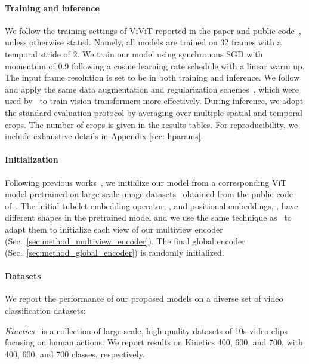 \paragraph{Training and inference} 
We follow the training settings of ViViT reported in the paper and public code~\cite{arnab2021vivit}, unless otherwise stated. 
Namely, all models are trained on 32 frames with a temporal stride of 2.
We train our model using synchronous SGD with momentum of 0.9 following a cosine learning rate schedule with a linear warm up.
The input frame resolution is set to be  in both training and inference. We follow~\cite{arnab2021vivit} and apply the same data augmentation and regularization schemes~\cite{huang_stochasticdepth_eccv_2016,zhang_mixup_iclr_2018,cubuk_arxiv_2019,szegedy_cvpr_2016}, which were used by~\cite{touvron2021training} to train vision transformers more effectively.
During inference, we adopt the standard evaluation protocol by averaging over multiple spatial and temporal crops.
The number of crops is given in the results tables.
For reproducibility, we include exhaustive details in Appendix \ref{sec: hparams}.



\paragraph{Initialization}
Following previous works~\cite{arnab2021vivit, bertasius_arxiv_2021,patrick2021keeping}, we initialize our model from a corresponding ViT model pretrained on large-scale image datasets~\cite{deng2009imagenet, 300m_iccv17} obtained from the public code of~\cite{dosovitskiy2020image}.
The initial tubelet embedding operator, , and positional embeddings, , have different shapes in the pretrained model and we use the same technique as~\cite{arnab2021vivit} to adapt them to initialize each view of our multiview encoder (Sec.~\ref{sec:method_multiview_encoder}).
The final global encoder (Sec.~\ref{sec:method_global_encoder}) is randomly initialized.



\paragraph{Datasets} We report the performance of our proposed models on a diverse set of video classification datasets:

\emph{Kinetics}~\cite{kay_arxiv_2017} is a collection of large-scale, high-quality datasets of 10s video clips focusing on human actions. We report results on Kinetics 400, 600, and 700, with 400, 600, and 700 classes, respectively.

